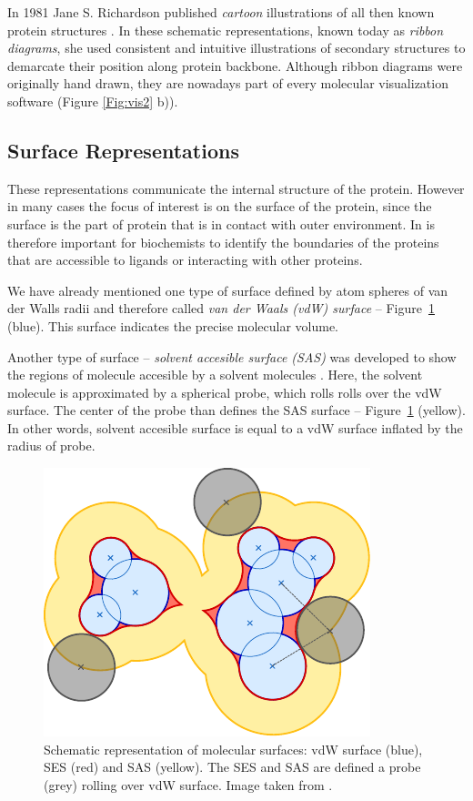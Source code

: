 In 1981 Jane S. Richardson published \textit{cartoon} illustrations of all then known protein structures \cite{richardson1981anatomy}. In these schematic representations, known today as \textit{ribbon diagrams}, she used consistent and intuitive illustrations of secondary structures to demarcate their position along protein backbone. Although ribbon diagrams were originally hand drawn, they are nowadays part of every molecular visualization software (Figure \ref{Fig:vis2} b)).

\subsection{Surface Representations}
These representations communicate the internal structure of the protein. However in many cases the focus of interest is on the surface of the protein, since the surface is the part of protein that is in contact with outer environment. In is therefore important for biochemists to identify the boundaries of the proteins that are accessible to ligands or interacting with other proteins.

We have already mentioned one type of surface defined by atom spheres of van der Walls radii and therefore called \textit{van der Waals (vdW) surface} \cite{richards1977areas} -- Figure~\ref{Fig:surface} (blue). This surface indicates the precise molecular volume.

Another type of surface -- \textit{solvent accesible surface (SAS)} was developed to show the regions of molecule accesible by a solvent molecules \cite{lee1971interpretation}. Here, the solvent molecule is approximated by a spherical probe, which rolls rolls over the vdW surface. The center of the probe than defines the SAS surface -- Figure~\ref{Fig:surface} (yellow). In other words, solvent accesible surface is equal to a vdW surface inflated by the radius of probe.

\begin{figure}[htb]
  \begin{center}
  \includegraphics[width=0.5\linewidth]{pictures/surface.pdf} 
  \caption{Schematic representation of molecular surfaces: vdW surface (blue), SES (red) and SAS (yellow). The SES and SAS are defined a probe (grey) rolling over vdW surface. Image taken from \cite{kozlikova2015visualization}.}
  \label{Fig:surface}  
\end{center}
\end{figure}


